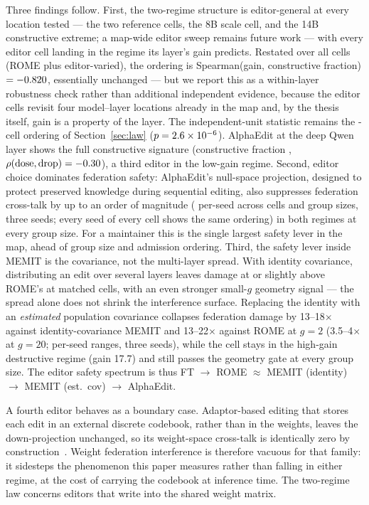 \documentclass[preprint,12pt]{elsarticle}
\theoremstyle{definition}
\begin{document}
Three findings follow. First, the two-regime structure is editor-general at every
location tested --- the two reference cells, the 8B scale cell, and the 14B
constructive extreme; a map-wide editor sweep remains future work --- with every
editor cell landing in the regime its layer's gain predicts. Restated over all \nCellsCombined{} cells
(ROME plus editor-varied), the ordering is Spearman(gain, constructive fraction)
$=-0.820{}$, essentially unchanged --- but we report this as a within-layer
robustness check rather than additional independent evidence, because the editor cells
revisit four model--layer locations already in the map and, by the thesis itself, gain is
a property of the layer. The independent-unit statistic remains the \nCells{}-cell
ordering of Section~\ref{sec:law} ($p=2.6\times10^{-6}{}$).
AlphaEdit at the deep Qwen layer shows the full constructive signature (constructive
fraction \alphaEditConstrFrac{}, $\rho(\mathrm{dose},\mathrm{drop})=-0.30{}$), a
third editor in the low-gain regime. Second, editor choice dominates federation safety:
AlphaEdit's null-space projection, designed to protect preserved knowledge during sequential
editing, also suppresses federation cross-talk by up to an order of magnitude
(\alphaSuppressRange{} per-seed across cells and group sizes, three seeds; every seed
of every cell shows the same ordering) in both regimes at every group size. For a maintainer this is the
single largest safety lever in the map, ahead of group size and admission ordering. Third,
the safety lever inside MEMIT is the covariance, not the multi-layer spread. With
identity covariance, distributing an edit over several layers leaves damage at or
slightly above ROME's at matched cells, with an even stronger small-$g$ geometry
signal --- the spread alone does not shrink the interference surface. Replacing the
identity with an \emph{estimated} population covariance collapses federation damage
by 13--18$\times$ against identity-covariance MEMIT and 13--22$\times$ against ROME at
$g{=}2$ (3.5--4$\times$ at $g{=}20$; per-seed ranges, three seeds), while the cell
stays in the high-gain destructive regime (gain 17.7) and still passes the geometry
gate at every group size. The editor safety spectrum is thus FT $\to$ ROME $\approx$
MEMIT (identity) $\to$ MEMIT (est.\ cov) $\to$ AlphaEdit.

A fourth editor behaves as a boundary case. Adaptor-based editing that stores each edit in an
external discrete codebook, rather than in the weights, leaves the down-projection unchanged,
so its weight-space cross-talk is identically zero by construction~\cite{grace2023}. Weight
federation interference is therefore vacuous for that family: it sidesteps the phenomenon
this paper measures rather than falling in either regime, at the cost of carrying the
codebook at inference time. The two-regime law concerns editors that write into the shared
weight matrix.
\end{document}
